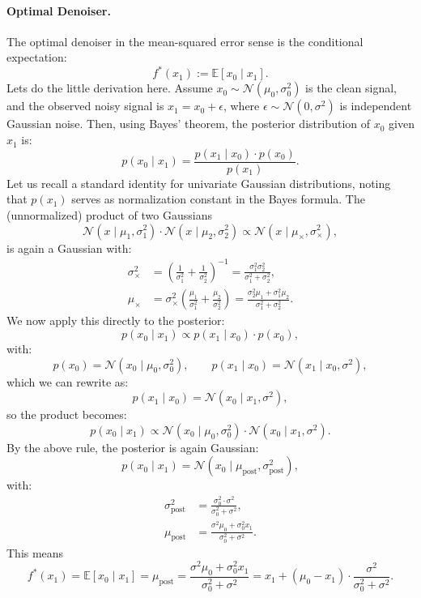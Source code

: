 \paragraph{Optimal Denoiser.}
The optimal denoiser in the mean-squared error sense is the conditional expectation:
\[
f^*(x_1) := \mathbb{E}[x_0 \mid x_1].
\]
Lets do the little derivation here. Assume \( x_0 \sim \mathcal{N}(\mu_0, \sigma_0^2) \) is the clean signal, and the observed noisy signal is \( x_1 = x_0 + \epsilon \), where \( \epsilon \sim \mathcal{N}(0, \sigma^2) \) is independent Gaussian noise. Then, using Bayes' theorem, the posterior distribution of \( x_0 \) given \( x_1 \) is:
\[
p(x_0 \mid x_1) = \frac{p(x_1 \mid x_0) \cdot p(x_0)}{p(x_1)}.
\]
Let us recall a standard identity for univariate Gaussian distributions, noting that $p(x_1)$ serves as normalization constant in the Bayes formula. The (unnormalized) product of two Gaussians 
\[
\mathcal{N}(x \mid \mu_1, \sigma_1^2) \cdot \mathcal{N}(x \mid \mu_2, \sigma_2^2) 
\propto \mathcal{N}\left(x \mid \mu_{\times}, \sigma_{\times}^2\right),
\]
is again a Gaussian with:
\begin{align*}
\sigma_{\times}^2 &= \left( \frac{1}{\sigma_1^2} + \frac{1}{\sigma_2^2} \right)^{-1}
= \frac{\sigma_1^2 \sigma_2^2}{\sigma_1^2 + \sigma_2^2}, \\
\mu_{\times} &= \sigma_{\times}^2 \left( \frac{\mu_1}{\sigma_1^2} + \frac{\mu_2}{\sigma_2^2} \right)
= \frac{\sigma_2^2 \mu_1 + \sigma_1^2 \mu_2}{\sigma_1^2 + \sigma_2^2}.
\end{align*}
We now apply this directly to the posterior:
\[
p(x_0 \mid x_1) \propto p(x_1 \mid x_0) \cdot p(x_0),
\]
with:
\[
p(x_0) = \mathcal{N}(x_0 \mid \mu_0, \sigma_0^2), \qquad
p(x_1 \mid x_0) = \mathcal{N}(x_1 \mid x_0, \sigma^2),
\]
which we can rewrite as:
\[
p(x_1 \mid x_0) = \mathcal{N}(x_0 \mid x_1, \sigma^2),
\]
so the product becomes:
\[
p(x_0 \mid x_1) \propto \mathcal{N}(x_0 \mid \mu_0, \sigma_0^2) \cdot \mathcal{N}(x_0 \mid x_1, \sigma^2).
\]
By the above rule, the posterior is again Gaussian:
\[
p(x_0 \mid x_1) = \mathcal{N}(x_0 \mid \mu_{\text{post}}, \sigma_{\text{post}}^2),
\]
with:
\begin{align*}
\sigma_{\text{post}}^2 &= \frac{\sigma_0^2 \cdot \sigma^2}{\sigma_0^2 + \sigma^2}, \\
\mu_{\text{post}} &= \frac{\sigma^2 \mu_0 + \sigma_0^2 x_1}{\sigma_0^2 + \sigma^2}.
\end{align*}
This means
\begin{equation}
f^*(x_1) = \mathbb{E}[x_0 \mid x_1] = \mu_{\text{post}} = \frac{\sigma^2 \mu_0 + \sigma_0^2 x_1}{\sigma_0^2 + \sigma^2}
= x_1 + (\mu_0 - x_1 )\cdot \frac{\sigma^2}{\sigma_0^2 + \sigma^2}.
\label{opt estimator}
\end{equation}
